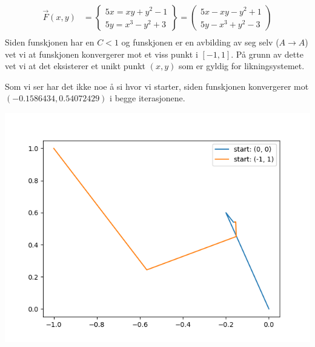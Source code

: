 \documentclass{../../myassignment}
\begin{document}
	\newpage
	\begin{answer}
		\begin{align*}
			\vec{F}(x,y) &= \begin{Bmatrix}
							5x = xy + y^2 - 1 \\
							5y = x^3 - y^2 + 3
						\end{Bmatrix} = 
						\begin{pmatrix}
							5x - xy - y^2 + 1 \\
							5y - x^3 + y^2 - 3
						\end{pmatrix}\\
		\end{align*}
			Siden funskjonen har en $C<1$ og funskjonen er en avbilding av seg selv ($A\to A$) vet vi at funskjonen konvergerer mot et viss punkt i $[-1,1]$. På grunn av dette vet vi at det eksisterer et unikt punkt $(x,y)$ som er gyldig for likningsystemet. 

	\end{answer}

	\begin{answer}
		Som vi ser har det ikke noe å si hvor vi starter, siden funskjonen konvergerer mot $(-0.1586434, 0.54072429)$ i begge iterasjonene.

		\includegraphics{iteration.png}
	\end{answer}
\end{document}
